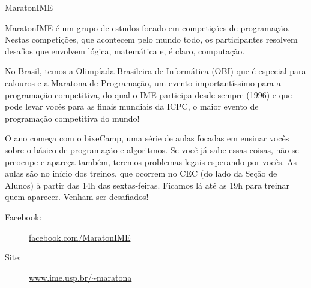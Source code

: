 \begin{subsecao}{MaratonIME}


MaratonIME é um grupo de estudos focado em competições de programação. Nestas
competições, que acontecem pelo mundo todo, os participantes resolvem desafios
que envolvem lógica, matemática e, é claro, computação.

No Brasil, temos a Olimpíada Brasileira de Informática (OBI) que é especial para
calouros e a Maratona de Programação, um evento importantíssimo para a
programação competitiva, do qual o IME participa desde sempre (1996) e que pode
levar vocês para as finais mundiais da ICPC, o maior evento de programação
competitiva do mundo!

O ano começa com o bixeCamp, uma série de aulas focadas em ensinar vocês sobre o
básico de programação e algoritmos. Se você já sabe essas coisas, não se
preocupe e apareça também, teremos problemas legais esperando por vocês. As
aulas são no início dos treinos, que ocorrem no CEC (do lado da Seção de Alunos)
à partir das 14h das sextas-feiras. Ficamos lá até as 19h para treinar quem
aparecer. Venham ser desafiados!

\begin{description}
\item [Facebook:] \url{facebook.com/MaratonIME}
\item[Site:] \url{www.ime.usp.br/~maratona}
\end{description}

\end{subsecao}
